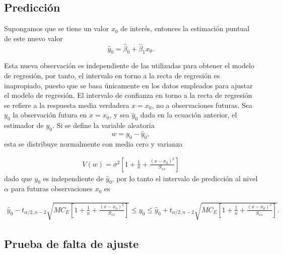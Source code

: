 \documentclass[a4paper]{report} %
\begin{document}
\subsection{Predicci\'on}

Supongamos que se tiene un valor $x_{0}$ de inter\'es, entonces la estimaci\'on puntual de este nuevo valor
\begin{equation}
\hat{y}_{0}=\hat{\beta}_{0}+\hat{\beta}_{1}x_{0}.
\end{equation}

Esta nueva observaci\'on es independiente de las utilizadas para obtener el modelo de regresi\'on, por tanto, el intervalo en torno a la recta de regresi\'on es inapropiado, puesto que se basa \'unicamente en los datos empleados para ajustar el modelo de regresi\'on. El intervalo de confianza en torno a la recta de regresi\'on se refiere a la respuesta media verdadera $x=x_{0}$, no a observaciones futuras. Sea $y_{0}$ la observaci\'on futura en $x=x_{0}$, y sea $\hat{y}_{0}$ dada en la ecuaci\'on anterior, el estimador de $y_{0}$. Si se define la variable aleatoria $$w=y_{0}-\hat{y}_{0},$$ esta se distribuye normalmente con media cero y varianza 

\begin{eqnarray}\label{Eq.Varianza.w}
V\left(w\right)=\sigma^{2}\left[1+\frac{1}{n}+\frac{\left(x-x_{0}\right)^2}{S_{xx}}\right]\end{eqnarray}
dado que $y_{0}$ es independiente de $\hat{y}_{0}$, por lo tanto el intervalo de predicci\'on al nivel $\alpha$ para futuras observaciones $x_{0}$ es


\begin{eqnarray}\label{Intervalo.Confianza.w}
\hat{y}_{0}-t_{\alpha/2,n-2}\sqrt{MC_{E}\left[1+\frac{1}{n}+\frac{\left(x-x_{0}\right)^2}{S_{xx}}\right]}\leq y_{0}\leq \hat{y}_{0}+t_{\alpha/2,n-2}\sqrt{MC_{E}\left[1+\frac{1}{n}+\frac{\left(x-x_{0}\right)^2}{S_{xx}}\right]}.
\end{eqnarray}




\subsection{Prueba de falta de ajuste}
\end{document}
